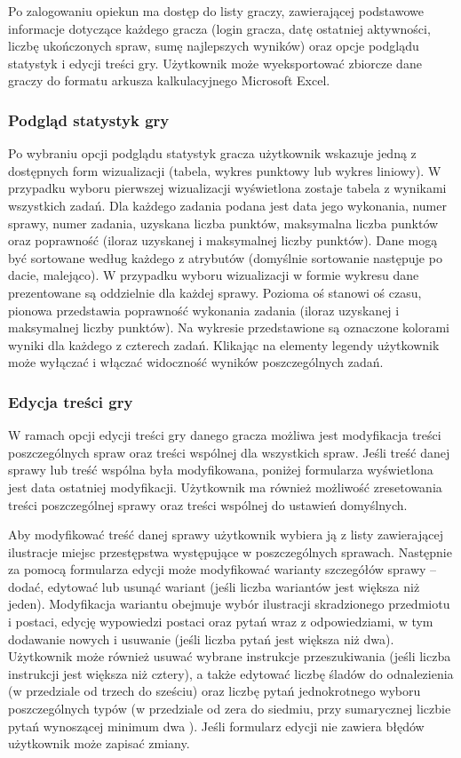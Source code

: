        Po zalogowaniu opiekun ma dostęp do listy graczy, zawierającej podstawowe informacje dotyczące każdego gracza (login gracza, datę ostatniej aktywności, liczbę ukończonych spraw, sumę najlepszych wyników) oraz opcje podglądu statystyk i edycji treści gry.
        Użytkownik może wyeksportować zbiorcze dane graczy do formatu arkusza kalkulacyjnego Microsoft Excel.
        
        \subsubsection{Podgląd statystyk gry}
        Po wybraniu opcji podglądu statystyk gracza użytkownik wskazuje jedną z dostępnych form wizualizacji (tabela, wykres punktowy lub wykres liniowy).
        W przypadku wyboru pierwszej wizualizacji wyświetlona zostaje tabela z wynikami wszystkich zadań.
        Dla każdego zadania podana jest data jego wykonania, numer sprawy, numer zadania, uzyskana liczba punktów, maksymalna liczba punktów oraz poprawność (iloraz uzyskanej i maksymalnej liczby punktów).
        Dane mogą być sortowane według każdego z atrybutów (domyślnie sortowanie następuje po dacie, malejąco).
        W przypadku wyboru wizualizacji w formie wykresu dane prezentowane są oddzielnie dla każdej sprawy.
        Pozioma oś stanowi oś czasu, pionowa przedstawia poprawność wykonania zadania (iloraz uzyskanej i maksymalnej liczby punktów).
        Na wykresie przedstawione są oznaczone kolorami wyniki dla każdego z czterech zadań.
        Klikając na elementy legendy użytkownik może wyłączać i włączać widoczność wyników poszczególnych zadań.
        
        \subsubsection{Edycja treści gry}
        W ramach opcji edycji treści gry danego gracza możliwa jest modyfikacja treści poszczególnych spraw oraz treści wspólnej dla wszystkich spraw. Jeśli treść danej sprawy lub treść wspólna była modyfikowana, poniżej formularza wyświetlona jest data ostatniej modyfikacji.
        Użytkownik ma również możliwość zresetowania treści poszczególnej sprawy oraz treści wspólnej do ustawień domyślnych.

        Aby modyfikować treść danej sprawy użytkownik wybiera ją z listy zawierającej ilustracje miejsc przestępstwa występujące w poszczególnych sprawach.
        Następnie za pomocą formularza edycji może modyfikować warianty szczegółów sprawy -- dodać, edytować lub usunąć wariant (jeśli liczba wariantów jest większa niż jeden).
        Modyfikacja wariantu obejmuje wybór ilustracji skradzionego przedmiotu i postaci, edycję wypowiedzi postaci oraz pytań wraz z odpowiedziami, w tym dodawanie nowych i usuwanie (jeśli liczba pytań jest większa niż dwa).
        Użytkownik może również usuwać wybrane instrukcje przeszukiwania (jeśli liczba instrukcji jest większa niż cztery), a także edytować liczbę śladów do odnalezienia (w przedziale od trzech do sześciu) oraz liczbę pytań jednokrotnego wyboru poszczególnych typów (w przedziale od zera do siedmiu, przy sumarycznej liczbie pytań wynoszącej minimum dwa ).
        Jeśli formularz edycji nie zawiera błędów użytkownik może zapisać zmiany.
        
